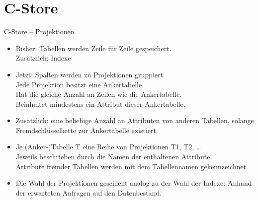 \section{C-Store}
\begin{frame}{C-Store -- Projektionen}
\begin{itemize}[<.->]
	\item<+-> Bisher: Tabellen werden Zeile f\"ur Zeile gespeichert.\\
	Zus\"atzlich: Indexe
	\item<+-> Jetzt: Spalten werden zu Projektionen gruppiert.\\
	Jede Projektion besitzt eine Ankertabelle.\\
	Hat die gleiche Anzahl an Zeilen wie die Ankertabelle.\\
	Beinhaltet mindestens ein Attribut dieser Ankertabelle.
	\item<+-> Zus\"atzlich: eine beliebige Anzahl an Attributen von anderen Tabellen, solange Fremdschl\"usselkette zur Ankertabelle existiert.
	\item Je (Anker-)Tabelle T eine Reihe von Projektionen T1, T2, \ldots\\
	Jeweils beschrieben durch die Namen der  enthaltenen Attribute. \\
	Attribute fremder Tabellen werden mit dem Tabellennamen gekennzeichnet.
	\item<+-> Die Wahl der Projektionen geschieht analog zu der Wahl der Indexe: Anhand der erwarteten Anfragen auf den Datenbestand.
\end{itemize}
\end{frame}

